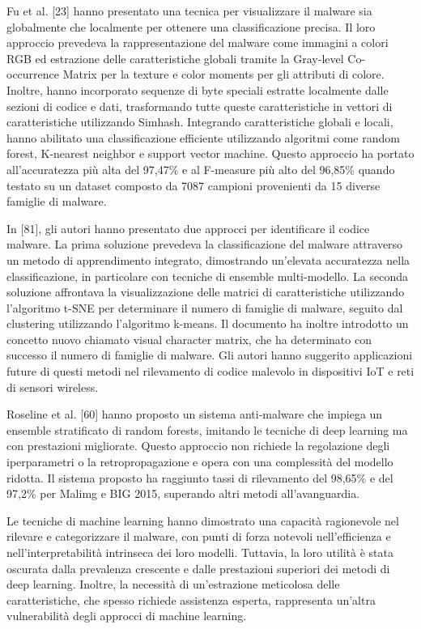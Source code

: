 Fu et al. [23] hanno presentato una tecnica per visualizzare il malware sia globalmente che localmente per ottenere una classificazione precisa. Il loro approccio prevedeva la rappresentazione del malware come immagini a colori RGB ed estrazione delle caratteristiche globali tramite la Gray-level Co-occurrence Matrix per la texture e color moments per gli attributi di colore. Inoltre, hanno incorporato sequenze di byte speciali estratte localmente dalle sezioni di codice e dati, trasformando tutte queste caratteristiche in vettori di caratteristiche utilizzando Simhash. Integrando caratteristiche globali e locali, hanno abilitato una classificazione efficiente utilizzando algoritmi come random forest, K-nearest neighbor e support vector machine. Questo approccio ha portato all'accuratezza più alta del 97,47\% e al F-measure più alto del 96,85\% quando testato su un dataset composto da 7087 campioni provenienti da 15 diverse famiglie di malware.

In [81], gli autori hanno presentato due approcci per identificare il codice malware. La prima soluzione prevedeva la classificazione del malware attraverso un metodo di apprendimento integrato, dimostrando un'elevata accuratezza nella classificazione, in particolare con tecniche di ensemble multi-modello. La seconda soluzione affrontava la visualizzazione delle matrici di caratteristiche utilizzando l'algoritmo t-SNE per determinare il numero di famiglie di malware, seguito dal clustering utilizzando l'algoritmo k-means. Il documento ha inoltre introdotto un concetto nuovo chiamato visual character matrix, che ha determinato con successo il numero di famiglie di malware. Gli autori hanno suggerito applicazioni future di questi metodi nel rilevamento di codice malevolo in dispositivi IoT e reti di sensori wireless.

Roseline et al. [60] hanno proposto un sistema anti-malware che impiega un ensemble stratificato di random forests, imitando le tecniche di deep learning ma con prestazioni migliorate. Questo approccio non richiede la regolazione degli iperparametri o la retropropagazione e opera con una complessità del modello ridotta. Il sistema proposto ha raggiunto tassi di rilevamento del 98,65\% e del 97,2\% per Malimg e BIG 2015, superando altri metodi all'avanguardia.

Le tecniche di machine learning hanno dimostrato una capacità ragionevole nel rilevare e categorizzare il malware, con punti di forza notevoli nell'efficienza e nell'interpretabilità intrinseca dei loro modelli. Tuttavia, la loro utilità è stata oscurata dalla prevalenza crescente e dalle prestazioni superiori dei metodi di deep learning. Inoltre, la necessità di un'estrazione meticolosa delle caratteristiche, che spesso richiede assistenza esperta, rappresenta un'altra vulnerabilità degli approcci di machine learning.

